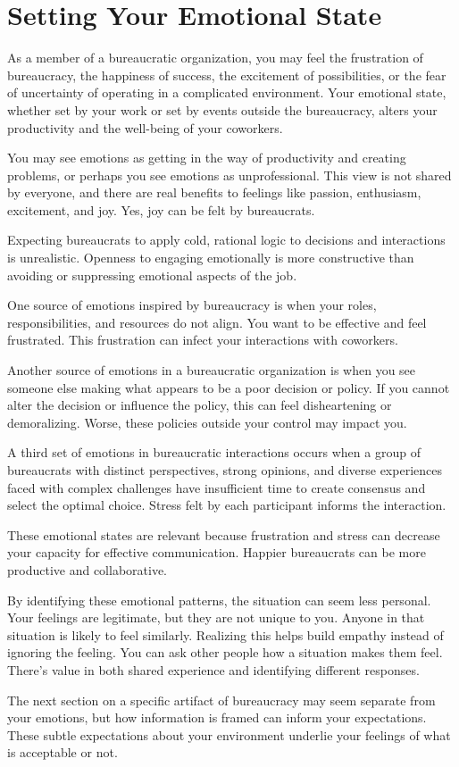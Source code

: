 \section{Setting Your Emotional State}

As a member of a bureaucratic organization, you may feel the frustration of bureaucracy, the happiness of success, the excitement of possibilities, or the fear of uncertainty of operating in a complicated environment. Your emotional state, whether set by your work or set by events outside the bureaucracy, alters your productivity and the well-being of your coworkers. 

You may see emotions as getting in the way of productivity and creating problems, or perhaps you see emotions as unprofessional. This view is not shared by everyone, and there are real benefits to feelings like passion, enthusiasm, excitement, and joy. Yes, joy can be felt by bureaucrats. 

Expecting bureaucrats to apply cold, rational logic to decisions and interactions is unrealistic. Openness to engaging emotionally is more constructive than avoiding or suppressing emotional aspects of the job. 

One source of emotions inspired by bureaucracy is when your roles, responsibilities, and resources do not align. You want to be effective and feel frustrated. This frustration can infect your interactions with coworkers. 

Another source of emotions in a bureaucratic organization is when you see someone else making what appears to be a poor decision or policy. If you cannot alter the decision or influence the policy, this can feel disheartening or demoralizing. Worse, these policies outside your control may impact you. 

A third set of emotions in bureaucratic interactions occurs when a group of bureaucrats with distinct perspectives, strong opinions, and diverse experiences faced with complex challenges have insufficient time to create consensus and select the optimal choice. Stress felt by each participant informs the interaction. 

These emotional states are relevant because frustration and stress can decrease your capacity for effective communication. Happier bureaucrats can be more productive and collaborative. 

By identifying these emotional patterns, the situation can seem less personal. Your feelings are legitimate, but they are not unique to you. Anyone in that situation is likely to feel similarly. Realizing this helps build empathy instead of ignoring the feeling.  You can ask other people how a situation makes them feel. There's value in both shared experience and identifying different responses. 

The next section on a specific artifact of bureaucracy may seem separate from your emotions, but how information is framed can inform your expectations. These subtle expectations about your environment underlie your feelings of what is acceptable or not.